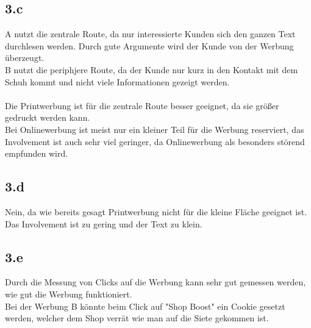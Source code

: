 \subsection{3.c}
    A nutzt die zentrale Route, da nur interessierte Kunden sich den ganzen Text durchlesen werden. Durch gute Argumente wird der Kunde von der Werbung überzeugt. \\
    B nutzt die periphjere Route, da der Kunde nur kurz in den Kontakt mit dem Schuh kommt und nicht viele Informationen gezeigt werden. \\
    \ \\
    Die Printwerbung ist für die zentrale Route besser geeignet, da sie größer gedruckt werden kann. \\
    Bei Onlinewerbung ist meist nur ein kleiner Teil für die Werbung reserviert, das Involvement ist auch sehr viel geringer, da Onlinewerbung als besonders störend empfunden wird.

\subsection{3.d}
    Nein, da wie bereits gesagt Printwerbung nicht für die kleine Fläche geeignet ist. Das Involvement ist zu gering und der Text zu klein. 

\subsection{3.e}
    Durch die Messung von Clicks auf die Werbung kann sehr gut gemessen werden, wie gut die Werbung funktioniert. \\
    Bei der Werbung B könnte beim Click auf "Shop Boost" ein Cookie gesetzt werden, welcher dem Shop verrät wie man auf die Siete gekommen ist.
